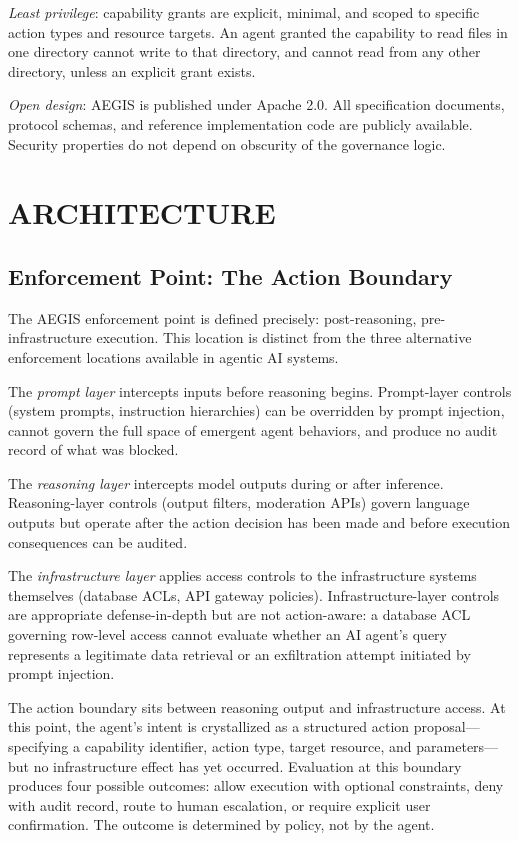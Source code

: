 \documentclass{IEEEcsmag}
\begin{document}
{\it Least privilege}: capability grants are explicit, minimal, and scoped to specific action types and resource targets. An agent granted the capability to read files in one directory cannot write to that directory, and cannot read from any other directory, unless an explicit grant exists.

{\it Open design}: AEGIS is published under Apache 2.0. All specification documents, protocol schemas, and reference implementation code are publicly available. Security properties do not depend on obscurity of the governance logic.

\section{ARCHITECTURE}

\subsection{Enforcement Point: The Action Boundary}

The AEGIS enforcement point is defined precisely: post-reasoning, pre-infrastructure execution. This location is distinct from the three alternative enforcement locations available in agentic AI systems.

The {\it prompt layer} intercepts inputs before reasoning begins. Prompt-layer controls (system prompts, instruction hierarchies) can be overridden by prompt injection, cannot govern the full space of emergent agent behaviors, and produce no audit record of what was blocked.

The {\it reasoning layer} intercepts model outputs during or after inference. Reasoning-layer controls (output filters, moderation APIs) govern language outputs but operate after the action decision has been made and before execution consequences can be audited.

The {\it infrastructure layer} applies access controls to the infrastructure systems themselves (database ACLs, API gateway policies). Infrastructure-layer controls are appropriate defense-in-depth but are not action-aware: a database ACL governing row-level access cannot evaluate whether an AI agent's query represents a legitimate data retrieval or an exfiltration attempt initiated by prompt injection.

The action boundary sits between reasoning output and infrastructure access. At this point, the agent's intent is crystallized as a structured action proposal---specifying a capability identifier, action type, target resource, and parameters---but no infrastructure effect has yet occurred. Evaluation at this boundary produces four possible outcomes: allow execution with optional constraints, deny with audit record, route to human escalation, or require explicit user confirmation. The outcome is determined by policy, not by the agent.
\end{document}
